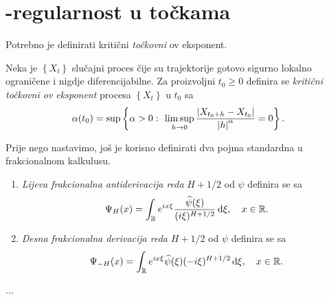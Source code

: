 \documentclass[main.tex]{subfiles}
\begin{document}
\nocite{*}

\section{\holder -regularnost u točkama}\label{sec:holpo}
Potrebno je definirati kritični \emph{točkovni} \holder ov eksponent.

\begin{definicija}
	Neka je \( \left\{ X_t \right\} \) slučajni proces čije su trajektorije gotovo sigurno
	lokalno ograničene i nigdje diferencijabilne. Za proizvoljni
	\( t_0 \ge 0 \) definira se \emph{kritični točkovni \holder ov eksponent} procesa
	\( \left\{ X_t \right\} \) u \( t_0 \) sa
	\begin{equation}
		\alpha(t_0) = \sup \left\{ \alpha > 0 \, \colon \,
		\limsup\limits_{h \rightarrow 0} \frac{\left| {X_{t_0+h}-X_{t_0}} \right|}{\left| {h} \right|^\alpha} = 0
		\right\}.
	\end{equation}
\end{definicija}


Prije nego nastavimo, još je korisno definirati dva pojma
standardna u frakcionalnom kalkulusu.

\begin{definicija}
	\begin{enumerate}
		\item \emph{Lijeva frakcionalna antiderivacija reda} \( H+1/2 \) od \( \psi \) definira se sa
		      \begin{equation}
			      \Psi_H(x) = \int_{\mathbb{R}} e^{ix\xi} \frac{\widehat{\psi}(\xi)}{(i\xi)^{H+1/2}} \,\mathrm d \xi, \quad x \in \mathbb{R}.
		      \end{equation}
		\item \emph{Desna frakcionalna derivacija reda} \( H+1/2 \) od \( \psi \) definira se sa
		      \begin{equation}
			      \Psi_{-H}(x)= \int_{\mathbb{R}} e^{ix\xi}\widehat{\psi}(\xi)(-i\xi)^{H+1/2} \,\mathrm d \xi, \quad x \in \mathbb{R}.
		      \end{equation}
	\end{enumerate}
\end{definicija}

\begin{komentar}
	...
\end{komentar}
\end{document}

